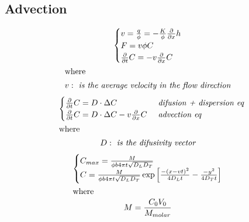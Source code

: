 \documentclass[landscape]{article}
\begin{document}
\begin{multicols*}{3}
\subsection{Advection} %
\label{sub:advection}
  \begin{gather}\label{eq:2.1}
      \begin{cases}
         v= \frac{q}{\phi} = -\frac{K}{\phi} \frac{\partial }{\partial x}h\\
         F = v\phi C\\
         \frac{\partial }{\partial t}C= - v\frac{\partial }{\partial x} C
       \end{cases} \notag\\
      \shortintertext{where}
      \begin{aligned}
        & v: \emph{ is the average velocity in the flow direction}
      \end{aligned}\notag
  \end{gather} 
  \begin{gather}\label{eq:2.1}
      \begin{cases}
         \frac{\partial }{\partial t}C = D\cdot \Delta C & \emph{ difusion + dispersion eq} \\
         \frac{\partial }{\partial t}C = D\cdot \Delta C -v\frac{\partial }{\partial x}C& \emph{ advection eq}
       \end{cases} \notag\\
      \shortintertext{where}
      \begin{aligned}
        & D: \emph{ is the difusivity vector}
      \end{aligned}\notag
  \end{gather}
  \begin{gather}\label{eq:2.1}
      \begin{cases}
         C_{max} = \frac{M}{\phi b 4\pi t \sqrt{D_L D_T}} \\
         C = \frac{M}{\phi b 4\pi t \sqrt{D_L D_T}} \exp \left[ \frac{-(x-vt)^2}{4D_L t} -\frac{-y^2}{4D_T t} \right]
       \end{cases} \notag\\
      \shortintertext{where}
      \begin{aligned}
        & M = \frac{C_0 V_0}{M_{molar}}
      \end{aligned}\notag
  \end{gather} 

\end{multicols*}
\end{document}
